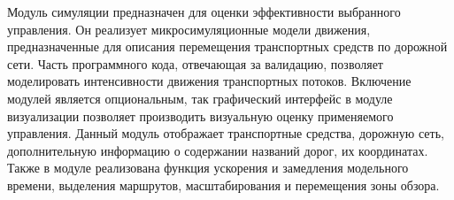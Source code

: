 \documentclass[11pt]{ubs}
\DeclareMathOperator{\state}{\mathcal{S}}
\DeclareMathOperator{\action}{\mathcal{A}}
\begin{document}
Модуль симуляции предназначен для оценки эффективности выбранного управления. 
Он реализует микросимуляционные модели движения, предназначенные для описания перемещения транспортных средств по дорожной сети. 
Часть программного кода, отвечающая за валидацию,  позволяет    моделировать интенсивности движения транспортных потоков. 
Включение модулей является опциональным, так графический интерфейс в модуле визуализации  позволяет производить визуальную оценку применяемого управления. Данный модуль отображает транспортные средства, дорожную сеть, дополнительную информацию о содержании названий дорог, их координатах. Также в модуле реализована функция ускорения и замедления модельного времени, выделения маршрутов, масштабирования и перемещения зоны обзора.














\end{document}
